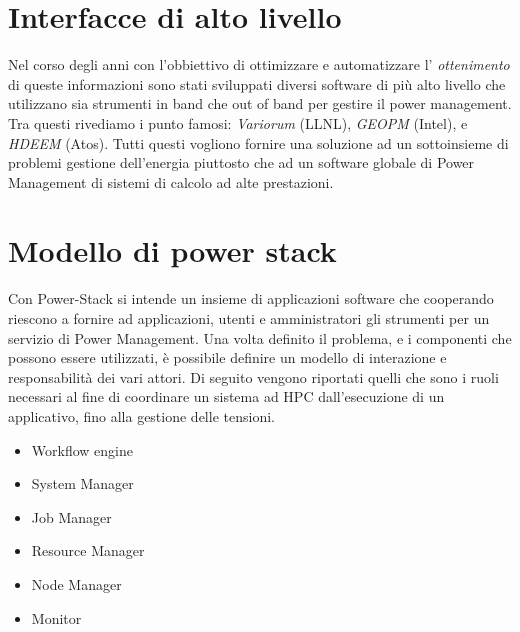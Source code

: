 \section{Interfacce di alto livello}
Nel corso degli anni con l'obbiettivo di ottimizzare e automatizzare l' \emph{ottenimento} di queste informazioni sono stati sviluppati diversi software di più alto livello che utilizzano sia strumenti in band che out of band per gestire il power management. Tra questi rivediamo i punto famosi: \emph{Variorum} (LLNL), \emph{GEOPM} (Intel)\cite{GEOPM}, e \emph{HDEEM} (Atos)\cite{HDEEM}. Tutti questi vogliono fornire una soluzione ad un sottoinsieme di problemi gestione dell'energia piuttosto che ad un software globale di Power Management di sistemi di calcolo ad alte prestazioni.


\section{Modello di power stack} %
Con Power-Stack si intende un insieme di applicazioni software che cooperando riescono a fornire ad applicazioni, utenti e amministratori gli strumenti per un servizio di Power Management. Una volta definito il problema, e i componenti che possono essere utilizzati, è possibile definire un modello di interazione e responsabilità dei vari attori. Di seguito vengono riportati quelli che sono i ruoli necessari al fine di coordinare un sistema ad HPC dall'esecuzione di un applicativo, fino alla gestione delle tensioni. 
\begin{itemize}
    \item Workflow engine
    \item System Manager
    \item Job Manager
    \item Resource Manager
    \item Node Manager
    \item Monitor
\end{itemize}

